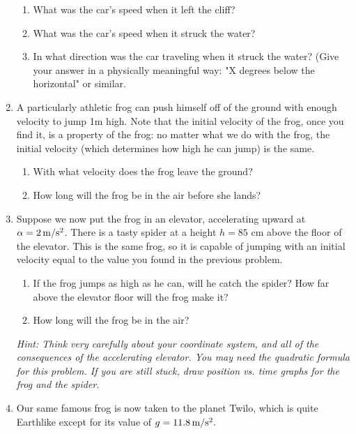 \documentclass[12pt]{article}
\begin{document}
\begin{enumerate}
\begin{enumerate}
\item What was the car's speed when it left the cliff?
\item What was the car's speed when it struck the water?
\item In what direction was the car traveling when it struck the water? (Give your answer in a physically meaningful way: "X degrees below the horizontal" or similar.
\end{enumerate}

\item A particularly athletic frog can push himself off of the ground with enough velocity to jump 1m high. Note that the initial velocity of the frog, once you find it, is a property of the frog: no matter what we do with the frog, the initial velocity (which determines how high he can jump) is the same.

\begin{enumerate}
\item With what velocity does the frog leave the ground?
\item How long will the frog be in the air before she lands?
\end{enumerate}

\item Suppose we now put the frog in an elevator, accelerating upward at $\alpha=2\, \rm m/\rm s^2$. There is a tasty spider at a height $h=85$ cm above the floor of the elevator. This is the same frog, so it is capable of jumping with an initial velocity equal to the value you found in the previous problem. 

\begin{enumerate}
\item If the frog jumps as high as he can, will he catch the spider? How far above the elevator floor will the frog make it?
\item How long will the frog be in the air?
\end{enumerate}

{\it Hint: Think very carefully about your coordinate system, and all of the consequences of the accelerating elevator. You may need the quadratic formula for this problem. If you are still stuck, draw position vs. time graphs for the frog and the spider.}

\item Our same famous frog is now taken to the planet Twilo, which is quite Earthlike except for its value of $g=11.8\, \rm m/\rm s^2.$


\end{enumerate}
\end{document}
